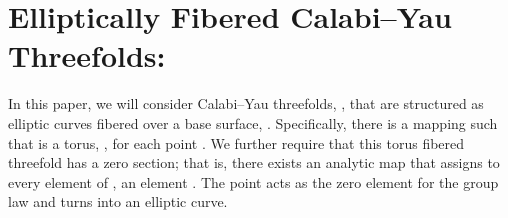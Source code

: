 \documentclass[a4paper,12pt]{article}
\numberwithin{equation}{section}
\theoremstyle{plain}
\begin{document}
\section{Elliptically Fibered Calabi--Yau Threefolds:}


In this paper, we will consider Calabi--Yau threefolds, \coordHE{}, that are 
structured as elliptic curves fibered over a base surface,
\coordHE{}. Specifically,  there is a mapping
\coordHE{} such that \coordHE{} is a torus, 
\coordHE{}, for each point \coordHE{}. We further require that 
this torus fibered threefold has a zero section; that is, there 
exists an analytic map \coordHE{} that assigns to 
every element \coordHE{} of \coordHE{}, an element \coordHE{}. The
point \coordHE{} acts as the zero element for the group law 
and turns \coordHE{} into an elliptic curve.
\end{document}
